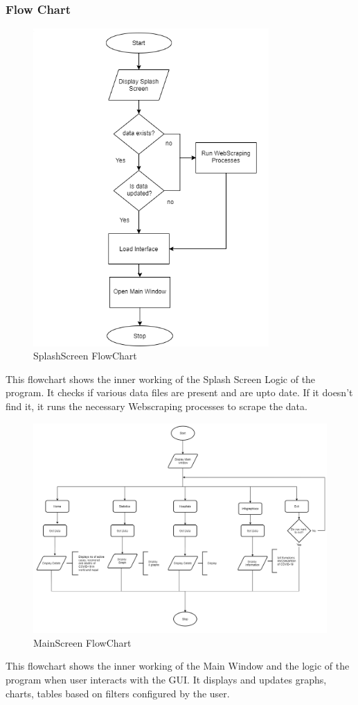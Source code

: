 \documentclass[12pt]{article}
\begin{document}
\subsubsection{Flow Chart}
\begin{figure}[h]
    \centerline{\includegraphics[width = 90mm]{SplashScreenFlowChart.png}}
    \caption{SplashScreen FlowChart}
    \label{fig}
\end{figure}
This flowchart shows the inner working of the Splash Screen Logic of the program. It checks if various data files are present and are upto date. If it doesn't find it, it runs the necessary Webscraping processes to scrape the data.
\clearpage
\begin{figure}[h]
    \centerline{\includegraphics[width = 150mm]{MainScreenFlowChart.png}}
    \caption{MainScreen FlowChart}
    \label{fig}
\end{figure}
This flowchart shows the inner working of the Main Window and the logic of the program when user interacts with the GUI. It displays and updates graphs, charts, tables based on filters configured by the user. 
\clearpage
\end{document}
